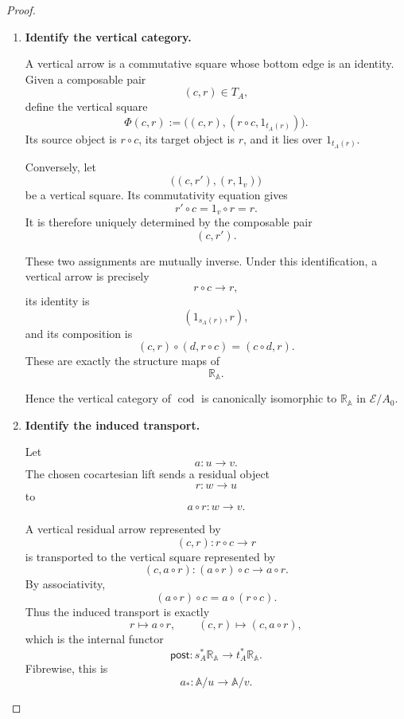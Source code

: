 \begin{proof}
\begin{enumerate}
        \item \textbf{Identify the vertical category.}

        A vertical arrow is a commutative square whose bottom edge is an
        identity. Given a composable pair
        \[
            (c,r)\in T_A,
        \]
        define the vertical square
        \[
            \Phi(c,r)
            :=
            \bigl(
                (c,r),
                (r\circ c,1_{t_A(r)})
            \bigr).
        \]
        Its source object is \(r\circ c\), its target object is \(r\), and it
        lies over \(1_{t_A(r)}\).

        Conversely, let
        \[
            \bigl(
                (c,r'),
                (r,1_v)
            \bigr)
        \]
        be a vertical square. Its commutativity equation gives
        \[
            r'\circ c=1_v\circ r=r.
        \]
        It is therefore uniquely determined by the composable pair
        \[
            (c,r').
        \]

        These two assignments are mutually inverse. Under this
        identification, a vertical arrow is precisely
        \[
            r\circ c\longrightarrow r,
        \]
        its identity is
        \[
            (1_{s_A(r)},r),
        \]
        and its composition is
        \[
            (c,r)\circ(d,r\circ c)
            =
            (c\circ d,r).
        \]
        These are exactly the structure maps of
        \[
            \mathbb R_{\mathbb A}.
        \]

        Hence the vertical category of \(\operatorname{cod}\) is canonically
        isomorphic to \(\mathbb R_{\mathbb A}\) in \(\mathcal E/A_0\).

        \item \textbf{Identify the induced transport.}

        Let
        \[
            a:u\to v.
        \]
        The chosen cocartesian lift sends a residual object
        \[
            r:w\to u
        \]
        to
        \[
            a\circ r:w\to v.
        \]

        A vertical residual arrow represented by
        \[
            (c,r):
            r\circ c\longrightarrow r
        \]
        is transported to the vertical square represented by
        \[
            (c,a\circ r):
            (a\circ r)\circ c
            \longrightarrow
            a\circ r.
        \]
        By associativity,
        \[
            (a\circ r)\circ c
            =
            a\circ(r\circ c).
        \]
        Thus the induced transport is exactly
        \[
            r\longmapsto a\circ r,
            \qquad
            (c,r)\longmapsto(c,a\circ r),
        \]
        which is the internal functor
        \[
            \mathsf{post}:
            s_A^*\mathbb R_{\mathbb A}
            \longrightarrow
            t_A^*\mathbb R_{\mathbb A}.
        \]
        Fibrewise, this is
        \[
            a_*:\mathbb A/u\to\mathbb A/v.
        \]
    \end{enumerate}
\end{proof}

